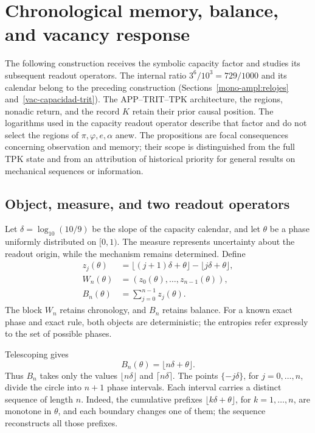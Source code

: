 \section{Chronological memory, balance, and vacancy response}
\label{md:cron:seccion}

The following construction receives the symbolic capacity factor and studies
its subsequent readout operators. The internal ratio $3^6/10^3=729/1000$ and its
calendar belong to the preceding construction
(Sections~\ref{mono-ampl:relojes} and~\ref{vac-capacidad-trit}).
The APP--TRIT--TPK architecture, the regions, nonadic return, and the
record $K$ retain their prior causal position. The logarithms used
in the capacity readout operator describe that factor and do not select the
regions of $\pi,\varphi,e,\alpha$ anew.
The propositions are focal consequences concerning observation and memory;
their scope is distinguished from the full TPK state and from an attribution
of historical priority for general results on mechanical sequences or
information.

\subsection{Object, measure, and two readout operators}
\label{md:cron:lectores}

Let $\delta=\log_{10}(10/9)$ be the slope of the capacity calendar,
and let $\theta$ be a phase uniformly distributed on $[0,1)$.
The measure represents uncertainty about the readout origin, while the
mechanism remains determined. Define
\begin{equation}
 \begin{aligned}
 z_j(\theta)&=\lfloor(j+1)\delta+\theta\rfloor
             -\lfloor j\delta+\theta\rfloor,\\
 W_n(\theta)&=(z_0(\theta),\ldots,z_{n-1}(\theta)),\\
 B_n(\theta)&=\sum_{j=0}^{n-1}z_j(\theta).
 \end{aligned}
 \label{md:cron:dos-lectores}
\end{equation}
The block $W_n$ retains chronology, and $B_n$ retains balance.
For a known exact phase and exact rule, both objects are
deterministic; the entropies refer expressly to the set of possible
phases.

Telescoping gives
\begin{equation}
 B_n(\theta)=\lfloor n\delta+\theta\rfloor.
 \label{md:cron:telescopia}
\end{equation}
Thus $B_n$ takes only the values $\lfloor n\delta\rfloor$ and
$\lceil n\delta\rceil$. The points $\{-j\delta\}$, for $j=0,\ldots,n$,
divide the circle into $n+1$ phase intervals. Each interval carries a
distinct sequence of length $n$. Indeed, the cumulative prefixes
$\lfloor k\delta+\theta\rfloor$, for $k=1,\ldots,n$, are monotone in
$\theta$, and each boundary changes one of them; the sequence reconstructs
all those prefixes.

